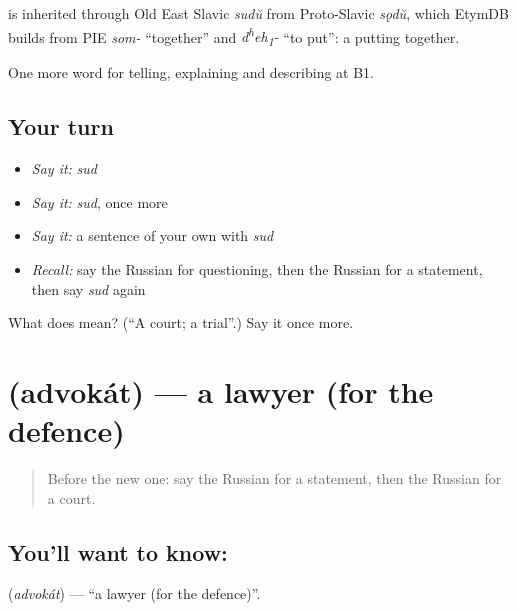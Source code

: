 \begin{cousinweb}
\emph{} is inherited through Old East Slavic \emph{sudŭ} from Proto-Slavic \emph{sǫdŭ}, which EtymDB builds from PIE \emph{som-} \textquotedblleft{}together\textquotedblright{} and \emph{d\textsuperscript{h}eh\textsubscript{1}-} \textquotedblleft{}to put\textquotedblright{}: a putting together.
\end{cousinweb}

\begin{grammarlens}[title={What you've built}]
One more word for telling, explaining and describing at B1.
\end{grammarlens}

\subsection*{Your turn}
\begin{itemize}
\raggedright
  \item \emph{Say it:} \emph{sud}
  \item \emph{Say it:} \emph{sud}, once more
  \item \emph{Say it:} a sentence of your own with \emph{sud}
  \item \emph{Recall:} say the Russian for questioning, then the Russian for a statement, then say \emph{sud} again
\end{itemize}

\begin{tcolorbox}[breakable,colback=teal!4,colframe=teal!35!black,title={Before you move on}]
What does  mean? (\textquotedblleft{}A court; a trial\textquotedblright{}.) Say it once more.
\end{tcolorbox}
\section[\texorpdfstring{\ru{адвокат} (advokát)}{адвокат (advokát)}]{ (advokát) — a lawyer (for the defence)}

\label{lesson:RU-C293-advokat}



\begin{quote}
Before the new one: say the Russian for a statement, then the Russian for a court.
\end{quote}

\subsection*{You'll want to know: }
\textbf{} (\emph{advokát}) — \textquotedblleft{}a lawyer (for the defence)\textquotedblright{}.

